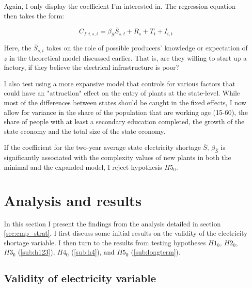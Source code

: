 \documentclass[11pt]{article}
\begin{document}
Again, I only display the coefficient I'm interested in. The regression equation then takes the form:

\begin{equation}
\label{eqn:entry}
C_{f,i,s,t} = \beta_{\bar{S}} \bar{S}_{s,t} + R_{s} + T_{t} + I_{i,t} 
\end{equation}

Here, the $\bar{S}_{s,t}$ takes on the role of possible producers' knowledge or expectation of $z$ in the theoretical model discussed earlier. That is, are they willing to start up a factory, if they believe the electrical infrastructure is poor?

I also test using a more expansive model that controls for various factors that could have an "attraction" effect on the entry of plants at the state-level. While most of the differences between states should be caught in the fixed effects, I now allow for variance in the share of the population that are working age (15-60), the share of people with at least a secondary education completed, the growth of the state economy and the total size of the state economy. 

If the coefficient for the two-year average state electricity shortage $\bar{S}$, $\beta_{\bar{S}}$ is significantly associated with the complexity values of new plants in both the minimal and the expanded model, I reject hypothesis $H5_0$.


\newpage

\section{Analysis and results}%
\label{sec:analysis_and_results}
In this section I present the findings from the analysis detailed in section \ref{sec:emp_strat}. I first discuss some initial results on the validity of the electricity shortage variable. I then turn to the results from testing hypotheses $H1_0$, $H2_0$, $H3_0$ (\ref{sub:h123}), $H4_0$ (\ref{sub:h4}), and $H5_0$ (\ref{sub:longterm}).

\subsection{Validity of electricity variable}%
\label{sub:validity_of_electricity_variable}
\end{document}
